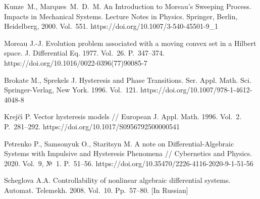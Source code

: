 \documentclass[12pt]{llncs}
\begin{document}
\begin{thebibliography}{9} %
	
 Kunze~M., Marques~M.~D.~M. An Introduction to Moreau's Sweeping Process. Impacts in Mechanical Systems. Lecture Notes in Physics. Springer, Berlin, Heidelberg, 2000. Vol.~551. https://doi.org/10.1007/3-540-45501-9\_1

 Moreau J.-J. Evolution problem associated with a moving convex set in a Hilbert space. J. Differential Eq. 1977. Vol.~26. P.~347--374. https://doi.org/10.1016/0022-0396(77)90085-7

 Brokate M., Sprekels J. Hysteresis and Phase Transitions. Ser. Appl. Math. Sci. Springer-Verlag, New York. 1996. Vol.~121. https://doi.org/10.1007/978-1-4612-4048-8

 Krej\u{c}\'{\i} P. Vector hysteresis models // European J. Appl. Math. 1996. Vol.~2. P.~281--292. https://doi.org/10.1017/S0956792500000541

 Petrenko P., Samsonyuk O., Staritsyn M. A note on Differential-Algebraic Systems with Impulsive and Hysteresis Phenomena // Cybernetics  and Physics. 2020. Vol.~9, №~1. P.~51--56. https://doi.org/10.35470/2226-4116-2020-9-1-51-56

 Scheglova A.A. Controllability of nonlinear algebraic differential systems. Automat. Telemekh. 2008. Vol.~10. Pp.~57--80. [In Russian]



\end{thebibliography}
\end{document}
